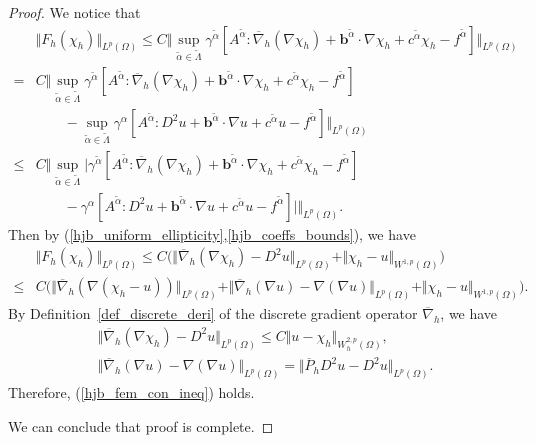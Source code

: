 \documentclass[12pt]{amsart}
\theoremstyle{definition}
\theoremstyle{remark}
\begin{document}
\begin{proof}
We notice that 
\begin{align*}
&\Vert F_{h}(\chi_{h})\Vert_{L^{p}(\Omega)} 
\leq C \Vert \sup_{\tilde{\alpha}\in \tilde{\Lambda}}\gamma^{\tilde{\alpha}}
[A^{\tilde{\alpha}}:\overline{\nabla}_{h}
(\nabla \chi_{h}) + \boldsymbol{b}^{\tilde{\alpha}}\cdot\nabla \chi_{h} 
+ c^{\tilde{\alpha}}\chi_{h} - f^{\tilde{\alpha}}]\Vert_{L^{p}(\Omega)}\\
= & C \Vert \sup_{\tilde{\alpha}\in \tilde{\Lambda}}\gamma^{\tilde{\alpha}}
[A^{\tilde{\alpha}}:\overline{\nabla}_{h}
(\nabla \chi_{h}) + \boldsymbol{b}^{\tilde{\alpha}}\cdot\nabla \chi_{h} 
+ c^{\tilde{\alpha}}\chi_{h} - f^{\tilde{\alpha}}] \\
& \qquad - \sup_{\tilde{\alpha}\in \tilde{\Lambda}}\gamma^{\alpha}
[A^{\tilde{\alpha}}:D^{2}u+\boldsymbol{b}^{\tilde{\alpha}}\cdot\nabla u 
+ c^{\tilde{\alpha}}u - f^{\tilde{\alpha}}]
\Vert_{L^{p}(\Omega)} \\
\leq & C \Vert \sup_{\tilde{\alpha}\in \tilde{\Lambda}}  
\vert \gamma^{\tilde{\alpha}}
[A^{\tilde{\alpha}}:\overline{\nabla}_{h}
(\nabla \chi_{h}) + \boldsymbol{b}^{\tilde{\alpha}}\cdot\nabla \chi_{h} 
+ c^{\tilde{\alpha}}\chi_{h} - f^{\tilde{\alpha}}] \\
& \qquad -  \gamma^{\alpha}
[A^{\tilde{\alpha}}:D^{2}u+\boldsymbol{b}^{\tilde{\alpha}}\cdot\nabla u 
+ c^{\tilde{\alpha}}u - f^{\tilde{\alpha}}]\vert \Vert_{L^{p}(\Omega)}.
\end{align*}
Then by (\ref{hjb_uniform_ellipticity},\ref{hjb_coeffs_bounds}), we have 
\begin{align*}
&\Vert F_{h}(\chi_{h})\Vert_{L^{p}(\Omega)} 
\leq C \big( \Vert \overline{\nabla}_{h}(\nabla \chi_{h}) - D^{2}u\Vert_{L^{p}
(\Omega)} + \Vert \chi_{h} - u\Vert_{W^{1,p}(\Omega)}\big) \\
\leq & C \big( \Vert \overline{\nabla}_{h}(\nabla (\chi_{h}-u))
\Vert_{L^{p}(\Omega)} + \Vert \overline{\nabla}_{h}(\nabla u) 
- \nabla (\nabla u)  \Vert_{L^{p}(\Omega)}  
+ \Vert \chi_{h} - u\Vert_{W^{1,p}(\Omega)}\big).
\end{align*}
By Definition~\ref{def_discrete_deri} of the discrete gradient operator 
$\overline{\nabla}_{h}$, we have 
\begin{align*}
& \Vert \overline{\nabla}_{h}(\nabla \chi_{h}) - D^{2}u\Vert_{L^{p}
(\Omega)} \leq C \Vert u - \chi_{h}\Vert_{W_{h}^{2,p}(\Omega)}, \\
& \Vert \overline{\nabla}_{h}(\nabla u) 
- \nabla (\nabla u)  \Vert_{L^{p}(\Omega)} 
= \Vert \overline{P}_{h}D^{2}u - D^{2}u\Vert_{L^{p}(\Omega)}.
\end{align*} 
Therefore, (\ref{hjb_fem_con_ineq}) holds.

We can conclude that proof is complete.
\end{proof}
\end{document}
